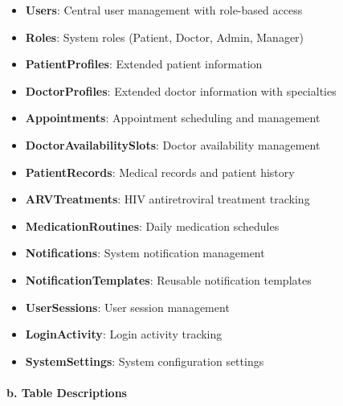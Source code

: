 \documentclass[12pt,a4paper]{article}
\begin{document}
\begin{itemize}
    \item \textbf{Users}: Central user management with role-based access
    \item \textbf{Roles}: System roles (Patient, Doctor, Admin, Manager)
    \item \textbf{PatientProfiles}: Extended patient information
    \item \textbf{DoctorProfiles}: Extended doctor information with specialties
    \item \textbf{Appointments}: Appointment scheduling and management
    \item \textbf{DoctorAvailabilitySlots}: Doctor availability management
    \item \textbf{PatientRecords}: Medical records and patient history
    \item \textbf{ARVTreatments}: HIV antiretroviral treatment tracking
    \item \textbf{MedicationRoutines}: Daily medication schedules
    \item \textbf{Notifications}: System notification management
    \item \textbf{NotificationTemplates}: Reusable notification templates
    \item \textbf{UserSessions}: User session management
    \item \textbf{LoginActivity}: Login activity tracking
    \item \textbf{SystemSettings}: System configuration settings
\end{itemize}

\paragraph{b. Table Descriptions}
\end{document}
